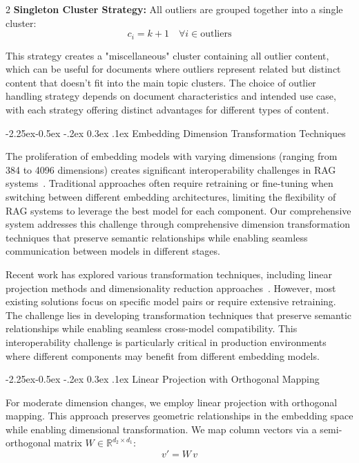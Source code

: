 \documentclass[10pt,letterpaper]{article}
\makeatletter
\let\cite\citep
\renewcommand{\subsection}{\@startsection{subsection}{2}{\z@}%
                                     {-2.25ex\@plus -0.5ex \@minus -.2ex}%
                                     {0.3ex \@plus .1ex}%
                                     {\normalfont\normalsize\itshape\bfseries}}
\renewcommand{\subsubsection}{\@startsection{subsubsection}{3}{\z@}%
                                     {-2.25ex\@plus -0.5ex \@minus -.2ex}%
                                     {0.3ex \@plus .1ex}%
                                     {\normalfont\normalsize\itshape}}
\makeatother
\begin{document}
\begin{multicols}{2}
\textbf{Singleton Cluster Strategy:} All outliers are grouped together into a single cluster:
\begin{equation}
c_i = k + 1 \quad \forall i \in \text{outliers}
\end{equation}

This strategy creates a "miscellaneous" cluster containing all outlier content, which can be useful for documents where outliers represent related but distinct content that doesn't fit into the main topic clusters. The choice of outlier handling strategy depends on document characteristics and intended use case, with each strategy offering distinct advantages for different types of content.

\subsection{Embedding Dimension Transformation Techniques}

The proliferation of embedding models with varying dimensions (ranging from 384 to 4096 dimensions) creates significant interoperability challenges in RAG systems~\cite{huerga2025optimization,brown2024cross}. Traditional approaches often require retraining or fine-tuning when switching between different embedding architectures, limiting the flexibility of RAG systems to leverage the best model for each component. Our comprehensive system addresses this challenge through comprehensive dimension transformation techniques that preserve semantic relationships while enabling seamless communication between models in different stages.

Recent work has explored various transformation techniques, including linear projection methods and dimensionality reduction approaches~\cite{garcia2024dimensionality,anderson2023embedding}. However, most existing solutions focus on specific model pairs or require extensive retraining. The challenge lies in developing transformation techniques that preserve semantic relationships while enabling seamless cross-model compatibility. This interoperability challenge is particularly critical in production environments where different components may benefit from different embedding models.

\subsubsection{Linear Projection with Orthogonal Mapping}

For moderate dimension changes, we employ linear projection with orthogonal mapping. This approach preserves geometric relationships in the embedding space while enabling dimensional transformation. We map column vectors via a semi-orthogonal matrix $W \in \mathbb{R}^{d_2 \times d_1}$:
\begin{equation}
v' = W\,v
\end{equation}


\end{multicols}
\end{document}
